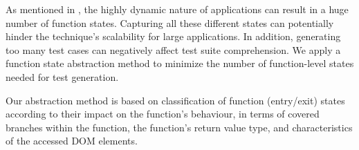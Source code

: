 As mentioned in , the highly dynamic nature of \javascript applications can result in a huge number of function states. Capturing all these different states can potentially hinder the technique's scalability for large applications. In addition, generating too many test cases can negatively affect test suite comprehension.
We apply a function state abstraction method to minimize the number of function-level states needed for test generation.



Our abstraction method is based on classification of function (entry/exit) states according to their impact on the function's behaviour, in terms of covered branches within the function, the function's return value type, and characteristics of the accessed DOM elements.

